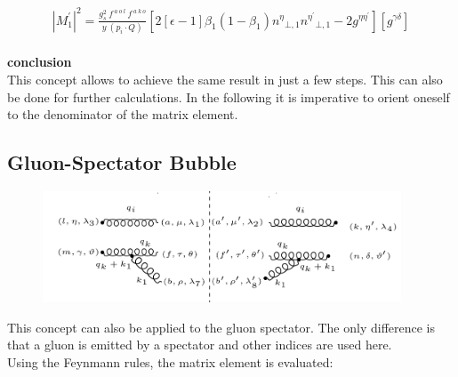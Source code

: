 \begin{equation}
\begin{split}
{|{M}^{\prime}_1|}^2 =\frac{g_s^2 \:f^{\:a\:o\:l}\: f^{\:a\:k\:o}}{y\:(p_i\cdot Q)}[2[\epsilon-1]{\beta_1}(1-\beta_1){n^{{\eta}}}_{\bot,1}{n^{{\eta}^{\prime}}}_{\bot,1}-2g^{{\eta}{{\eta}^{\prime}}}][g^{{\gamma}{{\delta}}}]
\end{split}
\end{equation}
\\

\textbf{conclusion}
\\
This concept allows to achieve the same result in just a few steps. This can also be done for further calculations.  
In the following it is imperative to orient oneself to the denominator of the matrix element.
\pagebreak
\subsection{Gluon-Spectator Bubble}
\begin{figure}[ht!]
\centering
\includegraphics[width=0.95\textwidth]{images/GG/M2Squer}
\end{figure}

This concept can also be applied to the gluon spectator. The only difference is that a gluon is emitted by a spectator and other indices are used here.\\
Using the Feynmann rules, the matrix element is evaluated:

